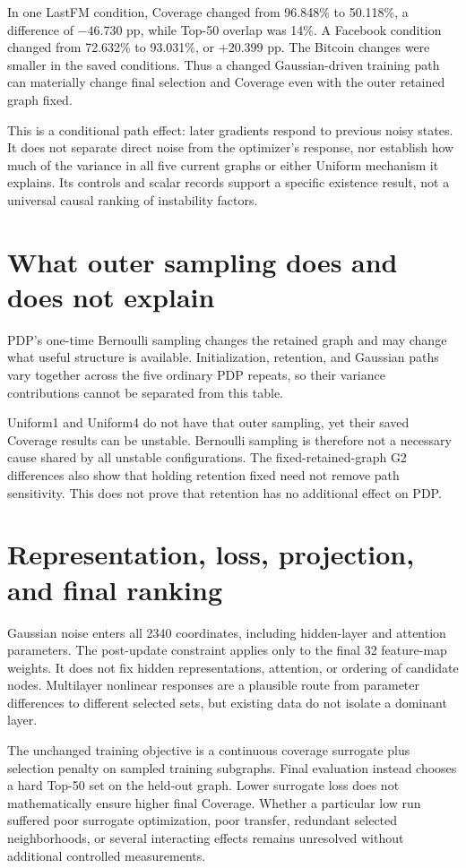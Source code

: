 In one LastFM condition, Coverage changed from 96.848\% to 50.118\%, a difference of $-46.730$ pp, while Top-50 overlap was 14\%. A Facebook condition changed from 72.632\% to 93.031\%, or $+20.399$ pp. The Bitcoin changes were smaller in the saved conditions. Thus a changed Gaussian-driven training path can materially change final selection and Coverage even with the outer retained graph fixed.

This is a conditional path effect: later gradients respond to previous noisy states. It does not separate direct noise from the optimizer's response, nor establish how much of the variance in all five current graphs or either Uniform mechanism it explains. Its controls and scalar records support a specific existence result, not a universal causal ranking of instability factors.

\section{What outer sampling does and does not explain}
PDP's one-time Bernoulli sampling changes the retained graph and may change what useful structure is available. Initialization, retention, and Gaussian paths vary together across the five ordinary PDP repeats, so their variance contributions cannot be separated from this table.

Uniform1 and Uniform4 do not have that outer sampling, yet their saved Coverage results can be unstable. Bernoulli sampling is therefore not a necessary cause shared by all unstable configurations. The fixed-retained-graph G2 differences also show that holding retention fixed need not remove path sensitivity. This does not prove that retention has no additional effect on PDP.

\section{Representation, loss, projection, and final ranking}
Gaussian noise enters all 2340 coordinates, including hidden-layer and attention parameters. The post-update constraint applies only to the final 32 feature-map weights. It does not fix hidden representations, attention, or ordering of candidate nodes. Multilayer nonlinear responses are a plausible route from parameter differences to different selected sets, but existing data do not isolate a dominant layer.

The unchanged training objective is a continuous coverage surrogate plus selection penalty on sampled training subgraphs. Final evaluation instead chooses a hard Top-50 set on the held-out graph. Lower surrogate loss does not mathematically ensure higher final Coverage. Whether a particular low run suffered poor surrogate optimization, poor transfer, redundant selected neighborhoods, or several interacting effects remains unresolved without additional controlled measurements.

